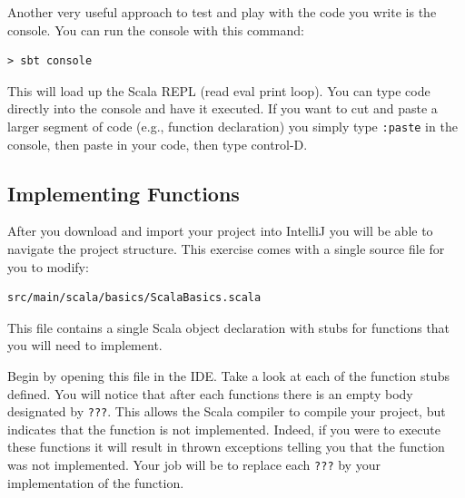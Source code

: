 \documentclass[12pt,a4paper]{exam}
\begin{document}
Another very useful approach to test and play with the code you write is the console. 
You can run the console with this command:
\begin{Verbatim}
> sbt console	
\end{Verbatim}
This will load up the Scala REPL (read eval print loop). You can type code directly into the console 
and have it executed. If you want to cut and paste a larger segment of code 
(e.g., function declaration) you simply type \verb!:paste! in the console, then paste in your code, then 
type control-D.

\subsection*{Implementing Functions}

After you download and import your project into IntelliJ you will be able to navigate the project structure. 
This exercise comes with a single source file for you to modify:
\begin{Verbatim}
src/main/scala/basics/ScalaBasics.scala	
\end{Verbatim}
This file contains a single Scala object declaration with stubs for functions that you will need to implement.

Begin by opening this file in the IDE. Take a look at each of the function stubs defined. 
You will notice that after each functions there is an empty body designated by \verb!???!. 
This allows the Scala compiler to compile your project, but indicates that the function is not implemented. 
Indeed, if you were to execute these functions it will result in thrown exceptions telling you that the 
function was not implemented. Your job will be to replace each \verb!???! 
by your implementation of the function.
\end{document}
